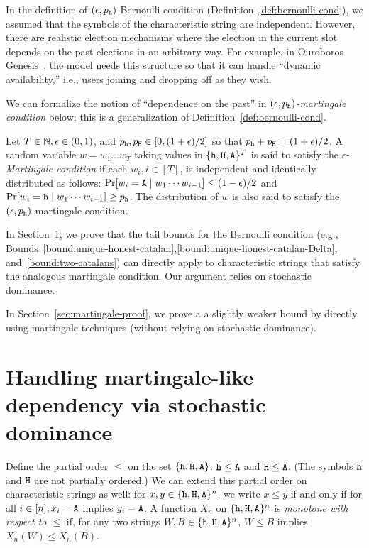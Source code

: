 In the definition of $(\epsilon, p_{\mathtt{h}})$-Bernoulli condition (Definition~\ref{def:bernoulli-cond}), 
we assumed that the symbols of the characteristic string are independent. 
However, there are realistic election mechanisms where 
the election in the current slot depends on the past elections in an arbitrary way. 
For example, in Ouroboros Genesis~\cite{Genesis}, the model needs this structure 
so that it can handle ``dynamic availability,'' i.e., users joining and dropping off as they wish.

We can formalize the notion of ``dependence on the past'' 
in \emph{$(\epsilon, p_{\mathtt{h}})$-martingale condition} below;
this is a generalization of Definition~\ref{def:bernoulli-cond}. 


\begin{definition}\label{def:martingale-cond}
  Let $T \in \mathbb{N}, \epsilon \in (0,1)$, and $p_{\mathtt{h}}, p_{\mathtt{H}} \in  [0, (1+\epsilon)/2]$ so that 
  $p_{\mathtt{h}} + p_{\mathtt{H}} = (1+\epsilon)/2$. A random variable $w = w_1 \ldots w_T$
  taking values in $\{\mathtt{h}, \mathtt{H}, \mathtt{A}\}^T$ is said to satisfy the
  \emph{$\epsilon$-Martingale condition} if each
  $w_i, i \in [T]$, is independent and identically distributed as
  follows: 
  $\Pr[w_i = \mathtt{A} \mid w_1 \cdots w_{i-1}] \leq (1-\epsilon)/2$ and 
  $\Pr[w_i = \mathtt{h} \mid w_1 \cdots w_{i-1}] \geq p_{\mathtt{h}}$.
  The distribution of $w$ is also said
  to satisfy the $(\epsilon, p_{\mathtt{h}})$-martingale condition.
\end{definition}


In Section~\ref{sec:martingale-dominance}, we prove that the tail bounds 
for the Bernoulli condition 
(e.g., Bounds~\ref{bound:unique-honest-catalan},\ref{bound:unique-honest-catalan-Delta}, 
and~\ref{bound:two-catalans})
can directly apply to characteristic strings that satisfy the analogous martingale condition. 
Our argument relies on stochastic dominance.

In Section~\ref{sec:martingale-proof}, 
we prove a a slightly weaker bound 
by directly using martingale techniques (without relying on stochastic dominance). 



\section{Handling martingale-like dependency via stochastic dominance}\label{sec:martingale-dominance}


  
  Define the partial order $\leq$ on the set $\{\mathtt{h}, \mathtt{H}, \mathtt{A}\}$:
  $\mathtt{h} \leq \mathtt{A}$ and $\mathtt{H} \leq \mathtt{A}$. 
  (The symbols $\mathtt{h}$ and $\mathtt{H}$ are not partially ordered.)
  We can extend this partial order on characteristic strings as well: 
  for $x,y \in \{\mathtt{h}, \mathtt{H}, \mathtt{A}\}^n$, 
  we write $x \leq y$ if and only if for all $i \in [n], x_i = \mathtt{A}$ implies $y_i = \mathtt{A}$.
  A function $X_n$ on $\{\mathtt{h}, \mathtt{H}, \mathtt{A}\}^n$ is \emph{monotone with respect to $\leq$} 
  if, for any two strings $W, B \in \{\mathtt{h}, \mathtt{H}, \mathtt{A}\}^n$, $W \leq B$ implies $X_n(W) \leq X_n(B)$. 

